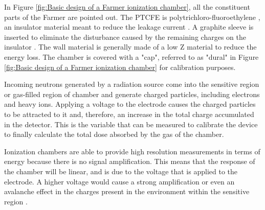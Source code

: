 In Figure \ref{fig:Basic design of a Farmer ionization chamber}, all the constituent parts of the Farmer are pointed out. The PTCFE is polytrichloro-fluoroethylene \cite{DesignOfThimbleChamber}, an insulator material meant to reduce the leakage current \cite{RadiationOncologyInPhysicsHandbook}. A graphite sleeve is inserted to eliminate the disturbance caused by the remaining charges on the insulator \cite{DesignOfThimbleChamber}. The wall material is generally made of a low Z material to reduce the energy loss. The chamber is covered with a "cap", referred to as "dural" in Figure \ref{fig:Basic design of a Farmer ionization chamber} for calibration purposes. 

Incoming neutrons generated by a radiation source come into the sensitive region or gas-filled region of chamber and generate charged particles, including electrons and heavy ions. Applying a voltage to the electrode causes the charged particles to be attracted to it and, therefore, an increase in the total charge accumulated in the detector. This is the variable that can be measured to calibrate the device to finally calculate the total dose absorbed by the gas of the chamber.

Ionization chambers are able to provide high resolution measurements in terms of energy because there is no signal amplification. This means that the response of the chamber will be linear, and is due to the voltage that is applied to the electrode. A higher voltage would cause a strong amplification or even an avalanche effect in the charges present in the environment within the sensitive region \cite{IntroToNuclearAndParticle}.